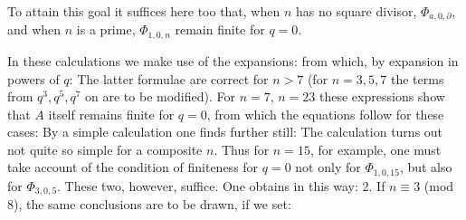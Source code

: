 To attain this goal it suffices here too that, when $n$ has no square divisor, $\Phi_{a,0,\partial}$, and when $n$ is a prime, $\Phi_{1,0,n}$ remain finite for $q=0$.

In these calculations we make use of the expansions:
from which, by expansion in powers of $q$:
The latter formulae are correct for $n>7$ (for $n=3,5,7$ the terms from $q^3, q^5, q^7$ on are to be modified). For $n=7$, $n=23$ these expressions show that $A$ itself remains finite for $q=0$, from which the equations follow for these cases:
By a simple calculation one finds further still:
The calculation turns out not quite so simple for a composite $n$. Thus for $n=15$, for example, one must take account of the condition of finiteness for $q=0$ not only for $\Phi_{1,0,15}$, but also for $\Phi_{3,0,5}$. These two, however, suffice. One obtains in this way:
2. If $n \equiv 3$ (mod 8), the same conclusions are to be drawn, if we set:
